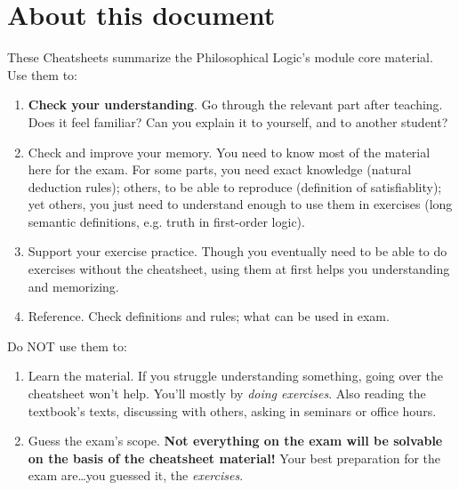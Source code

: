 \documentclass[../../../../include/open-logic-chapter]{subfiles}
\begin{document}
\chapter{About this document}

These Cheatsheets summarize the Philosophical Logic's module core
material. Use them to:
\begin{enumerate}
\item \textbf{Check your understanding}. Go through the relevant part
    after teaching. Does it feel familiar? Can you explain it to yourself, 
    and to another student?
\item Check and improve your memory. You need to know most of the
    material here for the exam. For some parts, you need exact
    knowledge (natural deduction rules); others, to be able to
    reproduce (definition of satisfiablity); yet others, you just need
    to understand enough to use them in exercises (long semantic
    definitions, e.g. truth in first-order logic).
\item Support your exercise practice. Though you eventually need
    to be able to do exercises without the cheatsheet, using them at 
    first helps you understanding and memorizing.
\item Reference. Check definitions and rules; what can be used in exam.
\end{enumerate}

Do NOT use them to:
\begin{enumerate}
\item Learn the material. If you struggle understanding something,
    going over the cheatsheet won't help. You'll mostly by
    \emph{doing exercises}. Also reading the textbook's texts, 
    discussing with others, asking in seminars or office hours. 
\item Guess the exam's scope. \textbf{Not everything on the exam
will be solvable on the basis of the cheatsheet material!} Your best
preparation for the exam are\dots you guessed it, the \emph{exercises}.
\end{enumerate}
\end{document}
